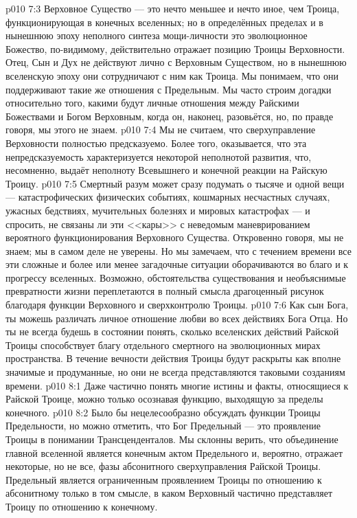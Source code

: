 \vs p010 7:3 Верховное Существо --- это нечто меньшее и нечто иное, чем Троица, функционирующая в конечных вселенных; но в определённых пределах и в нынешнюю эпоху неполного синтеза мощи\hyp{}личности это эволюционное Божество, по\hyp{}видимому, действительно отражает позицию Троицы Верховности. Отец, Сын и Дух не действуют лично с Верховным Существом, но в нынешнюю вселенскую эпоху они сотрудничают с ним как Троица. Мы понимаем, что они поддерживают такие же отношения с Предельным. Мы часто строим догадки относительно того, какими будут личные отношения между Райскими Божествами и Богом Верховным, когда он, наконец, разовьётся, но, по правде говоря, мы этого не знаем.
\vs p010 7:4 \pc Мы не считаем, что сверхуправление Верховности полностью предсказуемо. Более того, оказывается, что эта непредсказуемость характеризуется некоторой неполнотой развития, что, несомненно, выдаёт неполноту Всевышнего и конечной реакции на Райскую Троицу.
\vs p010 7:5 Смертный разум может сразу подумать о тысяче и одной вещи --- катастрофических физических событиях, кошмарных несчастных случаях, ужасных бедствиях, мучительных болезнях и мировых катастрофах --- и спросить, не связаны ли эти <<кары>> с неведомым маневрированием вероятного функционирования Верховного Существа. Откровенно говоря, мы не знаем; мы в самом деле не уверены. Но мы замечаем, что с течением времени все эти сложные и более или менее загадочные ситуации  оборачиваются во благо и к прогрессу вселенных. Возможно, обстоятельства существования и необъяснимые превратности жизни переплетаются в полный смысла драгоценный рисунок благодаря функции Верховного и сверхконтролю Троицы.
\vs p010 7:6 Как сын Бога, ты можешь различать личное отношение любви во всех действиях Бога Отца. Но ты не всегда будешь в состоянии понять, сколько вселенских действий Райской Троицы способствует благу отдельного смертного на эволюционных мирах пространства. В течение вечности действия Троицы будут раскрыты как вполне значимые и продуманные, но они не всегда представляются таковыми созданиям времени.
\vs p010 8:1 Даже частично понять многие истины и факты, относящиеся к Райской Троице, можно только осознавая функцию, выходящую за пределы конечного.
\vs p010 8:2 Было бы нецелесообразно обсуждать функции Троицы Предельности, но можно отметить, что Бог Предельный --- это проявление Троицы в понимании Трансценденталов. Мы склонны верить, что объединение главной вселенной является конечным актом Предельного и, вероятно, отражает некоторые, но не все, фазы абсонитного сверхуправления Райской Троицы. Предельный является ограниченным проявлением Троицы по отношению к абсонитному только в том смысле, в каком Верховный частично представляет Троицу по отношению к конечному.
